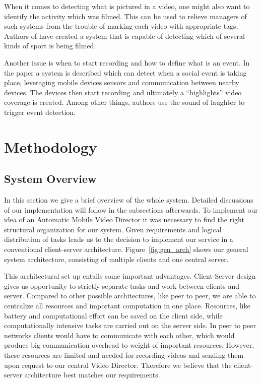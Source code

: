 \documentclass[conference]{IEEEtran}
\begin{document}
When it comes to detecting what is pictured in a video, one might also want to identify the activity which was filmed.
This can be used to relieve managers of such systems from the trouble of marking each video with appropriate tags. 
Authors of \cite{cricri_sport_2014} have created a system that is capable of detecting which of several kinds of sport is being filmed.

Another issue is when to start recording and how to define what is an event.
In the paper \cite{bao_movi:_2010} a system is described which can detect when a social event is taking place, leveraging
mobile devices sensors and communication between nearby devices.
The devices then start recording and ultimately a ``highlights'' video coverage is created.
Among other things, authors use the sound of laughter to trigger event detection.

\section{Methodology}

\subsection{System Overview}
In this section we give a brief overview of the whole system.
Detailed discussions of our implementation will follow in the subsections afterwards. 
To implement our idea of an Automatic Mobile Video Director it was necessary to find the right structural organization for our system.
Given requirements and logical distribution of tasks leads us to the decision 
to implement our service in a conventional client-server architecture.
Figure~\ref{fig:gen_arch} shows our general system architecture, consisting of multiple clients and one central server.

This architectural set up entails some important advantages.
Client-Server design gives us opportunity to strictly separate tasks and work between clients and server.
Compared to other possible architectures, like peer to peer, we are able to centralize all resources
and important computation in one place. 
Resources, like battery and computational effort can be saved on the client side, 
while computationally intensive tasks are carried out on the server side. 
In peer to peer networks clients would have to communicate with each other, 
which would produce big communication overhead to weight of important resources.
However, these resources are limited and needed for recording videos and sending them upon request to our central Video Director.
Therefore we believe that the client-server architecture best matches our requirements.
\end{document}
